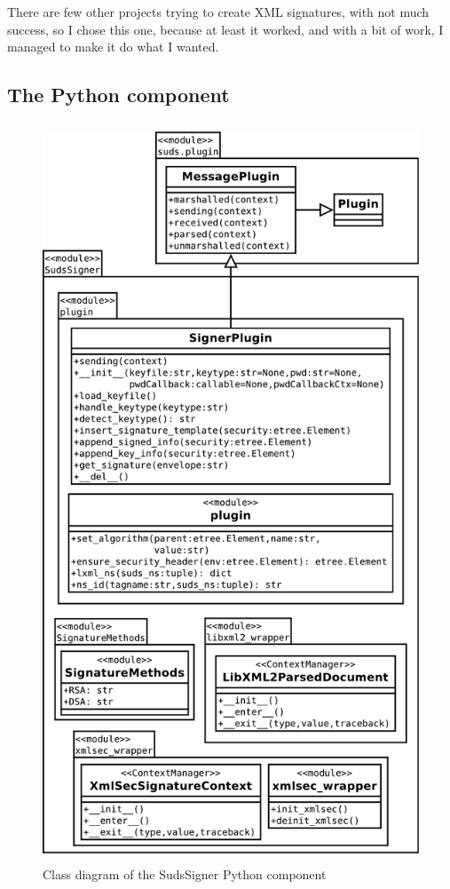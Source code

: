 There are few other projects trying to create XML signatures, with not much success, so I chose this one, because at least it worked, and with a bit of work, I managed to make it do what I wanted.

\subsection{The Python component}

\begin{figure}[htbp]
 \centering
 \includegraphics[height=22cm]{images/clsdSudsSigner.pdf}
 \caption{Class diagram of the SudsSigner Python component}
 \label{fig:clsdSudsSigner}
\end{figure}

